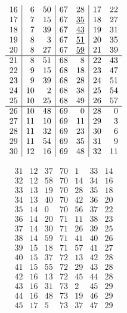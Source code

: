 \documentclass[11pt,a4paper]{article}
\begin{document}
\[
\begin{array}{r|rr|rr|rr}
16 & 6 & 50 & 67 & 28 & 17 & 22 \\
17 & 7 & 15 & 67 & \uncertain{35} & 18 & 27 \\
18 & 7 & 39 & 67 & \uncertain{43} & 19 & 31 \\
19 & 8 & 3 & 67 & \uncertain{51} & 20 & 35 \\
20 & 8 & 27 & 67 & \uncertain{59} & 21 & 39 \\
\hline
21 & 8 & 51 & 68 & 8 & 22 & 43 \\
22 & 9 & 15 & 68 & 18 & 23 & 47 \\
23 & 9 & 39 & 68 & 28 & 24 & 51 \\
24 & 10 & 2 & 68 & 38 & 25 & 54 \\
25 & 10 & 25 & 68 & 49 & 26 & 57 \\
\hline
26 & 10 & 48 & 69 & 0 & 28 & 0 \\
27 & 11 & 10 & 69 & 11 & 29 & 3 \\
28 & 11 & 32 & 69 & 23 & 30 & 6 \\
29 & 11 & 54 & 69 & 35 & 31 & 9 \\
30 & 12 & 16 & 69 & 48 & 32 & 11 \\
\end{array}
\]

\[
\begin{array}{r|rr|rr|rr}
31 & 12 & 37 & 70 & 1 & 33 & 14 \\
32 & 12 & 58 & 70 & 14 & 34 & 16 \\
33 & 13 & 19 & 70 & 28 & 35 & 18 \\
34 & 13 & 40 & 70 & 42 & 36 & 20 \\
35 & 14 & 0 & 70 & 56 & 37 & 22 \\
\hline
36 & 14 & 20 & 71 & 11 & 38 & 23 \\
37 & 14 & 30 & 71 & 26 & 39 & 25 \\
38 & 14 & 59 & 71 & 41 & 40 & 26 \\
39 & 15 & 18 & 71 & 57 & 41 & 27 \\
40 & 15 & 37 & 72 & 13 & 42 & 28 \\
\hline
41 & 15 & 55 & 72 & 29 & 43 & 28 \\
42 & 16 & 13 & 72 & 45 & 44 & 28 \\
43 & 16 & 31 & 73 & 2 & 45 & 29 \\
44 & 16 & 48 & 73 & 19 & 46 & 29 \\
45 & 17 & 5 & 73 & 37 & 47 & 29 \\
\end{array}
\]
\end{document}
